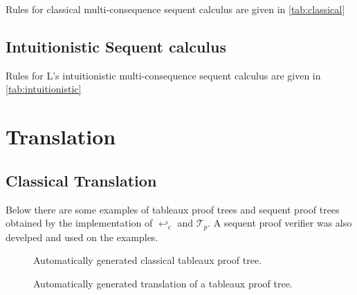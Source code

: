 \documentclass[runningheads]{llncs}
\begin{document}
Rules for classical multi-consequence sequent calculus are given in \ref{tab:classical}

\RulesClassicalSequentCalculus
\subsection {Intuitionistic Sequent calculus}

\developmentSequentIntuitionisticDefinition

Rules for L's intuitionistic multi-consequence sequent calculus are given in \ref{tab:intuitionistic}


\RulesIntuitionisticSequentCalculus


\section{Translation}

\nodeTranslationFunction

\uselessTheorem

\subsection{Classical Translation}



\localTranslationValidityTheorem
    


\TranslationClassical

\TranslationClassicalProof



Below there are some examples of tableaux proof trees and sequent proof trees obtained by the 
implementation of $\hookleftarrow_c$ and $\mathcal{T}_p$. A 
sequent proof verifier was also develped and used on the examples.


\begin{figure}

    {\fontsize{1}{1}\selectfont
    


    \ocmalImageII

\caption{Automatically generated classical tableaux proof tree.}
\label{fig:destructive_tableaux}
    }
\end{figure}

\begin{figure}

    {\fontsize{1}{1}\selectfont
\ocmalImageI

\caption{Automatically generated translation of a tableaux proof tree.}
\label{fig:destructive_tableaux}
    }
\end{figure}
\end{document}
